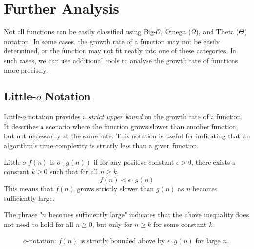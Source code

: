\section{Further Analysis}
Not all functions can be easily classified using Big-$\mathcal{O}$, Omega ($\Omega$), and Theta ($\Theta$) notation. In some cases, the growth rate of a function may not be easily determined, or the function may not fit neatly into one of these categories. In such cases, we can use additional tools to analyse the growth rate of functions more precisely.

\subsection*{Little-\texorpdfstring{$o$}{o} Notation}
Little-$o$ notation provides a \textit{strict upper bound} on the growth rate of a function. It describes a scenario where the function grows slower than another function, but not necessarily at the same rate. This notation is useful for indicating that an algorithm's time complexity is strictly less than a given function.

\begin{definition}{Little-$o$}\label{def:little_o_notation}
    $f(n)$ is $o(g(n))$ if for any positive constant $\epsilon > 0$, there exists a constant $k \geq 0$ such that for all $n \geq k$,
    \medskip
    \[
    f(n) < \epsilon \cdot g(n)
    \]
    \medskip
    This means that $f(n)$ grows strictly slower than $g(n)$ as $n$ becomes sufficiently large.
    
\end{definition}

The phrase "$n$ becomes sufficiently large" indicates that the above inequality does not need to hold for all $n \geq 0$, but only for $n \geq k$ for some constant $k$.

\begin{figure}[htbp]
    \centering
    \caption{$o$-notation: $f(n)$ is strictly bounded above by $\epsilon \cdot g(n)$ for large $n$.}
    \label{fig:little_o_notation}
\end{figure}

